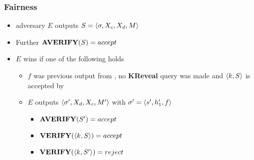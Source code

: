 \begin{frame}
	\frametitle{Fairness}

	\begin{itemize}[<+->]
		\setlength\itemsep{1em}
		\item adversary $E$ outputs $S=\langle \sigma,X_c, X_d, M \rangle$
		\item Further $\textbf{AVERIFY}(S)=accept$
		\item $E$ wins if one of the following holds
			\begin{itemize}
				\item $f$ was previous output from \keygen, no \textbf{KReveal} query was made and $\langle k, S \rangle$ is accepted by \verify
				\item $E$ outputs $\langle \sigma',X_d, X_c, M' \rangle$ with $\sigma' = \langle s', h_1', f \rangle$ 
					\begin{itemize}
						\item<6-> $\textbf{AVERIFY}(S') = accept$
						\item<6-> $\textbf{VERIFY}(\langle k,S \rangle) = accept$
						\item<6-> $\textbf{VERIFY}(\langle k,S' \rangle) = reject$
					\end{itemize}
			\end{itemize}
	\end{itemize}
\end{frame}